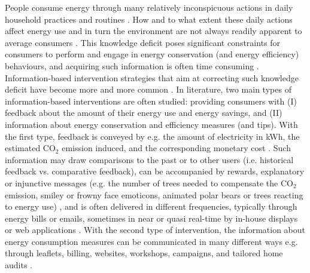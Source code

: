 \documentclass[a4paper,10pt]{article}
\begin{document}
People consume energy through many relatively inconspicuous actions in  daily household practices and routines \citep{Burgess2008,Hargreaves2010, Fehrenbacher2011,Burchell2014}. How and to what extent these daily actions affect energy use and in turn the environment are not always readily apparent to average consumers \citep{Burgess2008,Delmas2013}. This knowledge deficit poses significant constraints for consumers to perform and engage in energy conservation (and energy efficiency) behaviours, and acquiring such information is often time consuming \citep{Schultz2002,Delmas2013,Burchell2014}. 
% 
Information-based intervention strategies that aim at correcting such knowledge deficit have become more and more common \citep{Delmas2013}. 
% 
In literature, two main types of information-based interventions are often studied: providing consumers with (I) feedback about the amount of their energy use and energy savings, and (II) information about energy conservation and efficiency measures (and tips). With the first type, feedback is conveyed by e.g. the amount of electricity in kWh, the estimated CO$_{2}$ emission induced, and the corresponding monetary cost \citep{Abrahamse2005}. Such information may draw comparisons to the past or to other users (i.e. historical feedback vs. comparative feedback), can be accompanied by rewards, explanatory or injunctive messages (e.g. the number of trees needed to compensate the CO$_{2}$ emission, smiley or frowny face emoticons, animated polar bears or trees reacting to energy use) \citep{Schultz2007,Mankoff2010, Petkov2011}, and is often delivered in different frequencies, typically through energy bills or emails, sometimes in near or quasi real-time by in-house displays or web applications \citep{Abrahamse2005,Delmas2013}. With the second type of intervention, the information about energy consumption measures can be communicated in many different ways e.g. through leaflets, billing, websites, workshops, campaigns, and tailored home audits \citep{Abrahamse2005,Delmas2013}. 
\end{document}
